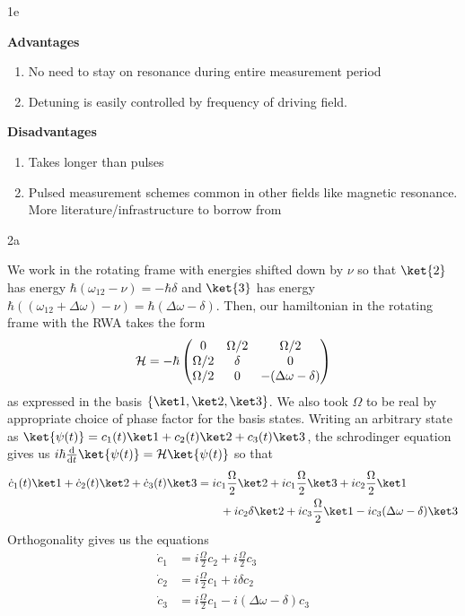 \documentclass[12pt]{article}
\begin{document}
\begin{exc}{1e}

\end{exc}
\begin{ans}
\textbf{Advantages}
\begin{enumerate}
    \item No need to stay on resonance during entire measurement period
    \item Detuning is easily controlled by frequency of driving field.
\end{enumerate}

\textbf{Disadvantages}
\begin{enumerate}
    \item Takes longer than pulses 
    \item Pulsed measurement schemes common in other fields like magnetic resonance. More literature/infrastructure to borrow from 
\end{enumerate}
\end{ans}


\newpage 
\begin{exc}{2a}

\end{exc}
\begin{ans}
    We work in the rotating frame with energies shifted down by $\nu$ so that $\ket{2}$ has energy $\hbar(\omega_{12} - \nu) = -\hbar\delta$ and $\ket{3}$ has energy $\hbar((\omega_{12} + \Delta \omega) - \nu) = \hbar(\Delta \omega - \delta)$. Then, our hamiltonian in the rotating frame with the RWA takes the form 
    \begin{align*}
        \mathcal{H} = -\hbar \begin{pmatrix}
            0 &  \Omega/2  &  \Omega/2 \\ 
             \Omega/2 & \delta & 0 \\ 
             \Omega/2 & 0 & -(\Delta \omega - \delta)
        \end{pmatrix}
    \end{align*}
    as expressed in the basis $\{\ket 1, \ket 2, \ket 3\}$. We also took $\Omega$ to be real by appropriate choice of phase factor for the basis states. Writing an arbitrary state as $\ket{\psi(t)} = c_1(t) \ket 1 + c_2(t) \ket 2 + c_3(t) \ket 3$, the schrodinger equation gives us $i\hbar \odv{}{t}\ket{\psi(t)} = \HH \ket{\psi(t)}$ so that 
    \begin{align*}
        \dot c_1(t) \ket 1 + \dot c_2(t) \ket 2 + \dot c_3(t) \ket 3 
        &= ic_1 \frac \Omega2 \ket 2 + ic_1 \frac \Omega2 \ket 3 + ic_2 \frac \Omega2\ket 1 \\
        & \qquad + ic_2\delta \ket 2 + ic_3\frac \Omega2\ket 1 - ic_3(\Delta \omega - \delta)\ket 3
    \end{align*}
    Orthogonality gives us the equations 
    \begin{align*}
        \dot c_1 &= i\frac \Omega2c_2  + i\frac \Omega2c_3\\
        \dot c_2 &= i\frac \Omega2 c_1 + i\delta c_2 \\ 
        \dot c_3 &= i\frac \Omega2 c_1 - i(\Delta \omega - \delta)c_3
    \end{align*}
\end{ans}
\end{document}
